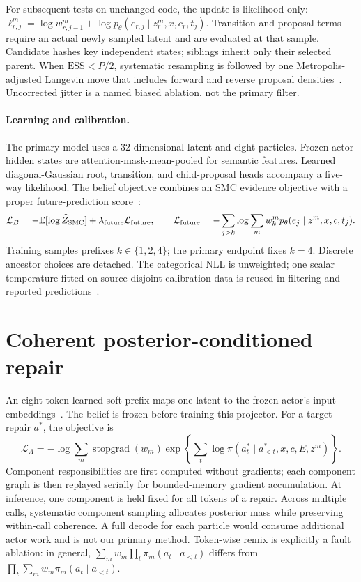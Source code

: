 \documentclass{article}
\begin{document}
For subsequent tests on unchanged code, the update is likelihood-only:
$\ell_{r,j}^m=\log w_{r,j-1}^m+\log p_\theta(e_{r,j}\mid z_r^m,x,c_r,t_j)$.
Transition and proposal terms require an actual newly sampled latent and are
evaluated at that sample. Candidate hashes key independent states; siblings
inherit only their selected parent. When $\mathrm{ESS}<P/2$, systematic
resampling is followed by one Metropolis-adjusted Langevin move that includes
forward and reverse proposal densities~\citep{gilks2001}. Uncorrected jitter
is a named biased ablation, not the primary filter.

\paragraph{Learning and calibration.}
The primary model uses a 32-dimensional latent and eight particles. Frozen
actor hidden states are attention-mask-mean-pooled for semantic features.
Learned diagonal-Gaussian root, transition, and child-proposal heads accompany
a five-way likelihood. The belief objective combines an SMC evidence objective
with a proper future-prediction score~\citep{maddison2017,naesseth2018}:
\begin{equation}
 \mathcal L_B=-\mathbb E[\log\widehat Z_{\rm SMC}]
 +\lambda_{\rm future}\mathcal L_{\rm future},\qquad
 \mathcal L_{\rm future}=-\sum_{j>k}\log\sum_m w_k^m
 p_\theta(e_j\mid z^m,x,c,t_j).
\end{equation}
Training samples prefixes $k\in\{1,2,4\}$; the primary endpoint fixes $k=4$.
Discrete ancestor choices are detached. The categorical NLL is unweighted;
one scalar temperature fitted on source-disjoint calibration data is reused
in filtering and reported predictions~\citep{guo2017}.

\section{Coherent posterior-conditioned repair}
\label{sec:action}
An eight-token learned soft prefix maps one latent to the frozen actor's input
embeddings~\citep{li2021prefix}. The belief is frozen before training this
projector. For a target repair $a^*$, the objective is
\begin{equation}
 \mathcal L_A=-\log\sum_m\operatorname{stopgrad}(w_m)
 \exp\left\{\sum_t\log\pi(a_t^*\mid a_{<t}^*,x,c,E,z^m)\right\}.
 \label{eq:mixture}
\end{equation}
Component responsibilities are first computed without gradients; each
component graph is then replayed serially for bounded-memory gradient
accumulation. At inference, one component is held fixed for all tokens of a
repair. Across multiple calls, systematic component sampling allocates
posterior mass while preserving within-call coherence. A full decode for each
particle would consume additional actor work and is not our primary method.
Token-wise remix is explicitly a fault ablation: in general,
$\sum_m w_m\prod_t\pi_m(a_t\mid a_{<t})$ differs from
$\prod_t\sum_m w_m\pi_m(a_t\mid a_{<t})$.
\end{document}
